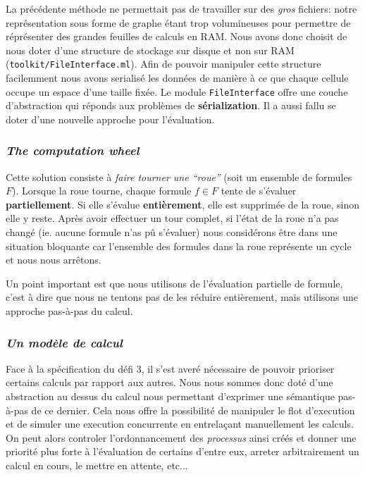 \documentclass[9pt]{article}
\begin{document}
La précédente méthode ne permettait pas de travailler sur des \textit{gros}
fichiers:
notre représentation sous forme de graphe étant trop volumineuses pour permettre de réprésenter
des grandes feuilles de calculs en RAM. Nous avons donc choisit de nous doter
d'une structure de
stockage sur disque et non sur RAM (\texttt{toolkit/FileInterface.ml}).
Afin de pouvoir manipuler cette structure facilemment nous avons serialisé les
données de manière à ce que chaque cellule occupe un espace d'une taille fixée.
Le module \texttt{FileInterface} offre une couche d'abstraction qui réponds aux
problèmes de \textbf{sérialization}. Il a aussi fallu se doter d'une
nouvelle approche pour l'évaluation.

\begin{center}
  \subsubsection*{\textit{The computation wheel}}
\end{center}

Cette solution consiste à \textit{faire tourner une ``roue''}
(soit un ensemble de formules $F$).
Lorsque la roue tourne, chaque formule $f \in F$ tente de s'évaluer
\textbf{partiellement}.
Si elle s'évalue \textbf{entièrement}, elle est supprimée de la roue, sinon elle
y reste.
Après avoir effectuer un tour complet, si l'état de la roue n'a pas changé
(ie. aucune formule n'as pû s'évaluer) nous considérons être dans une situation
bloquante car l'ensemble des formules dans la roue représente un cycle et
nous nous arrêtons.

Un point important est que nous utilisons de l'évaluation partielle de formule,
c'est à dire que nous ne tentons pas de les réduire entièrement,
mais utilisons une approche pas-à-pas du calcul.


\begin{center}
  \subsubsection*{\textit{Un modèle de calcul}}
\end{center}

Face à la spécification du défi 3, il s'est averé nécessaire de pouvoir
prioriser certains calculs par rapport aux autres.
Nous nous sommes donc doté d'une abstraction au dessus du calcul nous
permettant d'exprimer une sémantique pas-à-pas de ce dernier. Cela nous
offre la possibilité de manipuler le flot d'execution et de simuler une
execution concurrente en entrelaçant manuellement les calculs.
On peut alors controler l'ordonnancement des \textit{processus} ainsi créés et
donner une priorité plus forte à l'évaluation de certains d'entre eux,
arreter arbitrairement un calcul en cours, le mettre en attente, etc...
\end{document}
